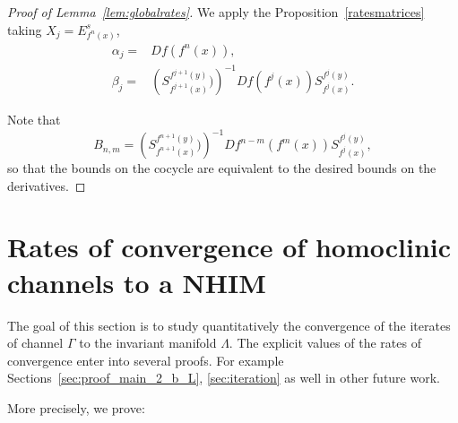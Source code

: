 \documentclass[11pt]{amsart}
\theoremstyle{definition}
\theoremstyle{remark}
\numberwithin{equation}{section}
\begin{document}
\begin{proof}[Proof of Lemma~\ref{lem:globalrates}]
  We apply the Proposition~\ref{ratesmatrices}
taking $X_j = E^s_{f^n(x)}$,
\[\begin{split}
\alpha_j =& Df( f^n(x) ),  \\
\beta_j =&
\left( S_{f^{j+1}(x)}^{f^{j+1}(y)} ) \right)^{-1}
 Df( f^j(x)) S_{f^j(x)}^{f^j(y)}.
\end{split}
\]

  Note that
  \[
  B_{n,m} = \left( S_{f^{n+1}(x)}^{f^{n+1}(y)} ) \right)^{-1}
    Df^{n-m}(f^m(x)) S_{f^j(x)}^{f^j(y)},
    \]
    so that the bounds on the cocycle are
    equivalent to the desired bounds on the derivatives.
\end{proof}




\section{Rates of convergence of homoclinic channels to a NHIM}
\label{sec:fiber_contraction}
The goal of this section is to study quantitatively the convergence of
the iterates of
channel $\Gamma$ to the invariant manifold $\Lambda$.
The explicit values of the rates of convergence enter into several proofs.
For example Sections~\ref{sec:proof_main_2_b_L}, \ref{sec:iteration}
as well in other future work.


More precisely, we prove:
\end{document}
